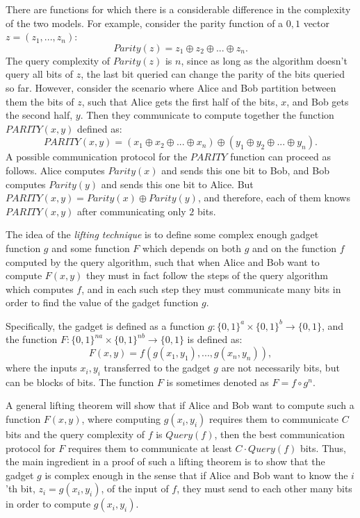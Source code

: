 \documentclass[11pt]{article}
\begin{document}
There are functions for which there is a considerable difference in the complexity of the two models.
For example, consider the parity function of a $0,1$ vector $z = (z_1,...,z_n)$:
$$Parity(z) =  z_1 \oplus z_2 \oplus ... \oplus z_n.$$
The query complexity of $Parity(z)$ is $n$,
since as long as the algorithm doesn't query all bits of $z$, the last bit queried can change the parity of the bits queried so far.
However, consider the scenario where Alice and Bob partition between them the bits of $z$, such that Alice gets the first half  of the bits, $x$, and Bob gets the second half, $y$.
Then they communicate to compute together the function $PARITY(x,y)$ defined as:
$$PARITY(x,y) =  (x_1 \oplus x_2 \oplus ... \oplus x_n) \oplus (y_1 \oplus y_2 \oplus ... \oplus y_n).$$
A possible communication protocol for the $PARITY$ function can proceed as follows.
Alice computes $Parity(x)$ and sends this one bit to Bob, and Bob computes $Parity(y)$ and sends this one bit to Alice.
But $PARITY(x,y) = Parity(x) \oplus Parity(y)$, and therefore, each of them knows $PARITY(x,y)$
after communicating only $2$ bits.

The idea of the {\em lifting technique} is to define some complex enough gadget function $g$ and some function $F$ which depends on both $g$ and on the
function $f$ computed by the query algorithm, such that when Alice and Bob want to compute  $F(x,y)$ they must in fact follow the steps of the query algorithm which computes $f$,
and in each such step they must communicate many bits in order to find the value of the gadget function $g$.

Specifically, the gadget is defined as a function $g:\{0,1\}^a \times \{0,1\}^b \rightarrow \{0,1\}$,
and  the function $F:\{0,1\}^{na} \times \{0,1\}^{nb} \rightarrow \{0,1\}$ is defined as:
$$F(x,y) = f(g(x_1,y_1),...,g(x_n,y_n)),$$
where the inputs $x_i,y_i$ transferred to the gadget $g$ are not necessarily bits, but can be blocks of bits.
The function $F$ is sometimes denoted as $F = f\circ g^n$.

A general lifting theorem will show that if Alice and Bob want to compute such a function $F(x,y)$, where
computing $g(x_i,y_i)$ requires them to communicate $C$ bits and the query complexity of $f$ is $Query(f)$,
then the best communication protocol for $F$ requires  them to communicate at least $C \cdot Query(f)$ bits.
Thus, the main ingredient in a proof of such a lifting theorem is to show that the gadget $g$ is complex enough in the sense that if Alice and Bob want to know the $i$'th bit, $z_i = g(x_i,y_i)$,
of the input of $f$, they must send to each other many bits in order to compute $g(x_i,y_i)$.
\end{document}
